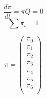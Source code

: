 \begin{frame}
    \vspace{-1.2cm}
    \begin{multicols}{2}
        \begin{equation*}
            \frac{d \pi}{dt} = \pi Q = 0
        \end{equation*}
        \begin{equation*}
            \sum \pi_i = 1
        \end{equation*}
        \columnbreak
        
        \begin{equation*}
            \pi = 
            \begin{pmatrix}
                \pi_{0} \\
                \pi_{1} \\
                \pi_{2} \\
                \pi_{3} \\
                \pi_{4} \\
                \pi_{5} \\
                \pi_{6} \\
            \end{pmatrix}
        \end{equation*}
    \end{multicols}
\end{frame}


